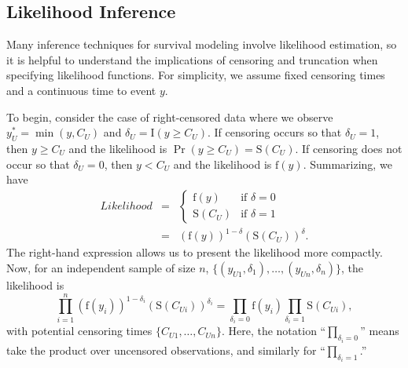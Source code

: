 \linejed

\subsection{Likelihood Inference}

Many inference techniques for survival modeling involve likelihood
estimation, so it is helpful to understand the implications of
censoring and truncation when specifying likelihood functions. For
simplicity, we assume fixed censoring times and a continuous time to
event $y$.

To begin, consider the case of right-censored data where we observe
$y_U^{\ast}= \min(y, C_U)$ and $\delta_U= \mathrm{I}(y \geq C_U)$.
If censoring occurs so that $\delta_U=1$, then $y \geq C_U$ and the
likelihood is $ \Pr(y \geq C_U) = \mathrm{S}(C_U)$. If censoring
does not occur so that $\delta_U=0$, then $y < C_U$ and the
likelihood is $\mathrm{f}(y)$. Summarizing, we have
\begin{eqnarray*}
Likelihood  &=& \left\{
\begin{array}{cl}
\mathrm{f}(y) & \textrm{if~}\delta=0 \\
\mathrm{S}(C_U)  &  \textrm{if~}\delta=1
\end{array}
\right. \\&=& \left( \mathrm{f}(y)\right)^{1-\delta} \left(
\mathrm{S}(C_U)\right)^{\delta} .
\end{eqnarray*}
The right-hand expression allows us to present the likelihood more
compactly. Now, for an independent sample of size $n$, $\{ (y_{U1},
\delta_1), \ldots,(y_{Un}, \delta_n) \} $, the likelihood is
\begin{equation*}
\prod_{i=1}^n \left( \mathrm{f}(y_i)\right)^{1-\delta_i} \left(
\mathrm{S}(C_{Ui})\right)^{\delta_i} = \prod_{\delta_i=0}
\mathrm{f}(y_i) \prod_{\delta_i=1} \mathrm{S}(C_{Ui}),
\end{equation*}
with potential censoring times $\{ C_{U1},  \ldots,C_{Un} \} $.
Here, the notation ``$\prod_{\delta_i=0}$'' means take the product
over uncensored observations, and similarly for
``$\prod_{\delta_i=1}$.''

